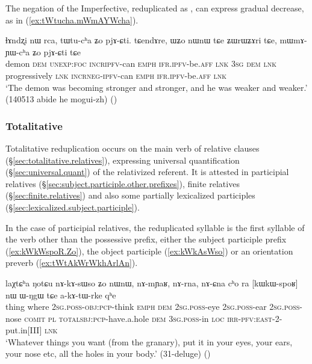 The negation  of the Imperfective, reduplicated as , can express gradual decrease, as in (\ref{ex:tWtucha.mWmAYWcha}).

\begin{exe}
\ex \label{ex:tWtucha.mWmAYWcha}
\gll ɬɤndʐi nɯ rca, tɯ\redp{}tu-cʰa ʑo pjɤ-ɕti. tɕendɤre, ɯʑo nɯnɯ tɕe ʑɯrɯʑɤri tɕe, mɯ\redp{}mɤ-ɲɯ-cʰa ʑo pjɤ-ɕti tɕe \\
demon \textsc{dem} \textsc{unexp}:\textsc{foc} \textsc{incr}\redp{}\textsc{ipfv}-can \textsc{emph} \textsc{ifr}.\textsc{ipfv}-be.\textsc{aff} \textsc{lnk} \textsc{3sg} \textsc{dem} \textsc{lnk} progressively \textsc{lnk} \textsc{incr}\redp{}\textsc{neg}-\textsc{ipfv}-can \textsc{emph} \textsc{ifr}.\textsc{ipfv}-be.\textsc{aff} \textsc{lnk} \\
\glt `The demon was becoming stronger and stronger, and he was weaker and weaker.' (140513 abide he mogui-zh)
()
\end{exe}

\subsubsection{Totalitative} \label{sec:totalitative.redp}
Totalitative reduplication occurs on the main verb of relative clauses (§\ref{sec:totalitative.relatives}), expressing universal quantification (§\ref{sec:universal.quant}) of the relativized referent. It is attested in participial relatives (§\ref{sec:subject.participle.other.prefixes}), finite relatives (§\ref{sec:finite.relatives}) and also some partially lexicalized participles (§\ref{sec:lexicalized.subject.participle}).

In the case of participial relatives, the reduplicated syllable is the first syllable of the verb other than the possessive prefix, either the subject participle prefix  (\ref{ex:kWkWspoR.Zo}), the object participle  (\ref{ex:kWkAsWso}) or an orientation preverb (\ref{ex:tWtAkWrWkhArlAn}).

\begin{exe}
\ex \label{ex:kWkWspoR.Zo}
\gll laχtɕʰa ŋotɕu nɤ-kɤ-sɯso ʑo nɯnɯ, nɤ-mɲaʁ, nɤ-rna, nɤ-ɕna cʰo ra [kɯ\redp{}kɯ-spoʁ] nɯ ɯ-ŋgɯ tɕe a-kɤ-tɯ-rke qʰe \\
thing where \textsc{2sg}.\textsc{poss}-\textsc{obj}:\textsc{pcp}-think \textsc{emph} \textsc{dem} \textsc{2sg}.\textsc{poss}-eye \textsc{2sg}.\textsc{poss}-ear \textsc{2sg}.\textsc{poss}-nose \textsc{comit} \textsc{pl} \textsc{total}\redp{}\textsc{sbj}:\textsc{pcp}-have.a.hole \textsc{dem} \textsc{3sg}.\textsc{poss}-in \textsc{loc} \textsc{irr}-\textsc{pfv}:\textsc{east}-2-put.in[III] \textsc{lnk} \\
\glt `Whatever things you want (from the granary), put it in your eyes, your ears, your nose etc, all the holes in your body.' (31-deluge)
()
\end{exe}

